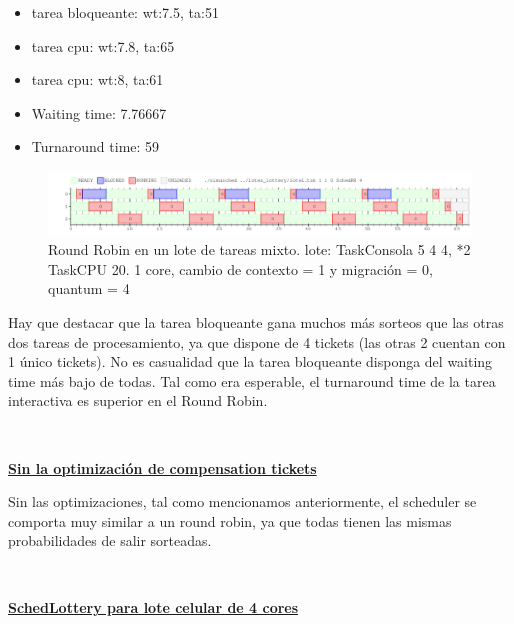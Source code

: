 \begin{itemize}
	\item tarea bloqueante: wt:7.5, ta:51
	\item tarea cpu: wt:7.8, ta:65
	\item tarea cpu: wt:8, ta:61
	\item  Waiting time: 7.76667
	\item  Turnaround time: 59
\end{itemize}

\begin{figure}[H]
  \centering\includegraphics[scale=0.5]{graficos/peor.png}
  \caption{Round Robin en un lote de tareas mixto. lote: TaskConsola 5 4 4, *2 TaskCPU 20.
	1 core, cambio de contexto = 1 y migración = 0, quantum = 4}
\end{figure}

Hay que destacar que la tarea bloqueante gana muchos más sorteos que las otras dos tareas de procesamiento, ya que dispone de 4 tickets (las otras 2 cuentan con 1 único tickets).
No es casualidad que la tarea bloqueante disponga del waiting time más bajo de todas. Tal como era esperable, el turnaround time de la tarea interactiva es superior en el 
Round Robin.

~

\textbf{\underline{Sin la optimización de compensation tickets}}

Sin las optimizaciones, tal como mencionamos anteriormente, el scheduler se comporta muy similar a un round robin, ya que todas tienen las mismas probabilidades de salir sorteadas.

~

\textbf{\underline{SchedLottery para lote celular de 4 cores}}

